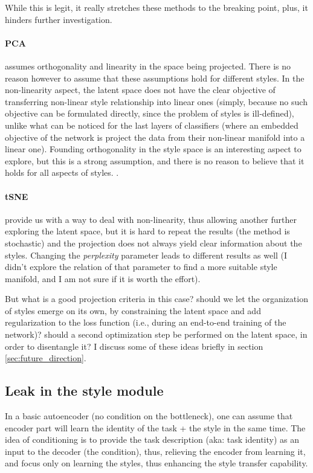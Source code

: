 While this is legit, it really stretches these methods to the breaking point, plus, it hinders further investigation.

\paragraph{PCA} assumes orthogonality and linearity in the space being projected. There is no reason however to assume that these assumptions hold for different styles.
In the non-linearity aspect, the latent space does not have the clear objective of transferring non-linear style relationship into linear ones (simply, because no such objective can be formulated directly, since the problem of styles is ill-defined), unlike what can be noticed for the last layers of classifiers (where an embedded objective of the network is project the data from their non-linear manifold into a linear one).
Founding orthogonality in the style space is an interesting aspect to explore, but this is a strong assumption, and there is no reason to believe that it holds for all aspects of styles.
.
\paragraph{tSNE} provide us with a way to deal with non-linearity, thus allowing another further exploring the latent space, but it is hard to repeat the results (the method is stochastic) and the projection does not always yield clear information about the styles. Changing the \textit{perplexity} parameter leads to different results as well (I didn't explore the relation of that parameter to find a more suitable style manifold, and I am not sure if it is worth the effort).

But what is a good projection criteria in this case? should we let the organization of styles emerge on its own, by constraining the latent space and add regularization to the loss function (i.e., during an end-to-end training of the network)? should a second optimization step be performed on the latent space, in order to disentangle it? I discuss some of these ideas briefly in section \ref{sec:future_direction}.

\subsection{Leak in the style module}
\par In a basic autoencoder (no condition on the bottleneck), one can assume that encoder part will learn the identity of the task + the style in the same time. The idea of conditioning is to provide the task description (aka: task identity) as an input to the decoder (the condition), thus, relieving the encoder from learning it, and focus only on learning the styles, thus enhancing the style transfer capability.


